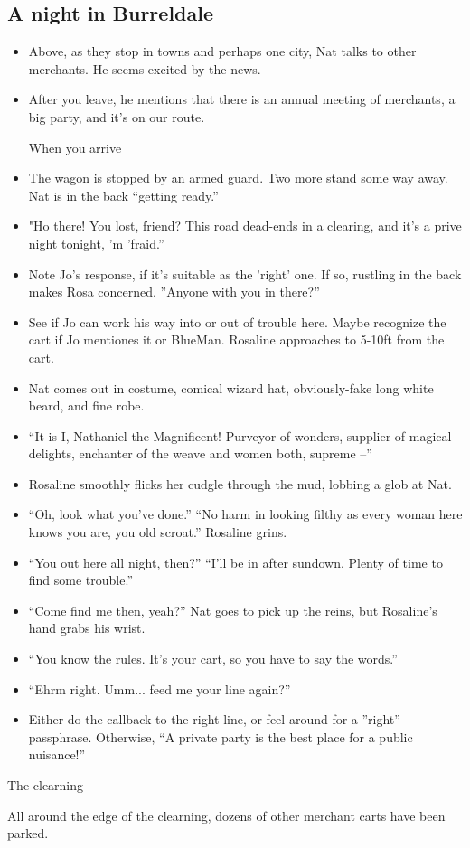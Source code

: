 \begin{multicols}{2}
\subsection{A night in Burreldale}
  \begin{itemize}
  \item Above, as they stop in towns and perhaps one city, Nat talks to other merchants.  He seems excited by the news.
  \item After you leave, he mentions that there is an annual meeting of merchants, a big party, and it's on our route.
  \item [When you arrive]
  \item The wagon is stopped by an armed guard.  Two more stand some way away.  Nat is in the back ``getting ready.''
  \item "Ho there!  You lost, friend?  This road dead-ends in a clearing, and it's a prive night tonight, 'm 'fraid.''  
  \item Note Jo's response, if it's suitable as the 'right' one.  If so, rustling in the back makes Rosa concerned.  ''Anyone with you in there?''
  \item See if Jo can work his way into or out of trouble here.  Maybe recognize the cart if Jo mentiones it or BlueMan.  Rosaline approaches to 5-10ft from the cart.
  \item Nat comes out in costume, comical wizard hat, obviously-fake long white beard, and fine robe.
  \item ``It is I, Nathaniel the Magnificent!  Purveyor of wonders, supplier of magical delights, enchanter of the weave and women both, supreme --''
  \item Rosaline smoothly flicks her cudgle through the mud, lobbing a glob at Nat.
  \item ``Oh, look what you've done.''  ``No harm in looking filthy as every woman here knows you are, you old scroat.''  Rosaline grins.
  \item ``You out here all night, then?''  ``I'll be in after sundown.  Plenty of time to find some trouble.''
  \item ``Come find me then, yeah?''  Nat goes to pick up the reins, but Rosaline's hand grabs his wrist.
  \item ``You know the rules.  It's your cart, so you have to say the words.''
  \item ``Ehrm right.  Umm... feed me your line again?''
  \item Either do the callback to the right line, or feel around for a ''right'' passphrase.  Otherwise, ``A private party is the best place for a public nuisance!''
  \end{itemize}
\columnbreak
  The clearning
  \begin{aloud}
  All around the edge of the clearning, dozens of other merchant carts have been parked.


\end{aloud}
\end{multicols}
